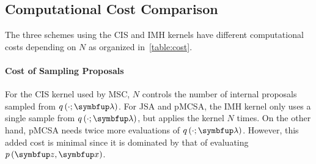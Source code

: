 
\begin{table*}[t]
  \vspace{-2ex}
  \centering
  
  \vspace{-1ex}
\end{table*}
%
\vspace{-0.05in}
\subsection{Computational Cost Comparison}
\vspace{-0.05in}
The three schemes using the CIS and IMH kernels have different computational costs depending on \(N\) as organized in~\cref{table:cost}.

\vspace{-0.1in}
\paragraph{Cost of Sampling Proposals}
For the CIS kernel used by MSC, \(N\) controls the number of internal proposals sampled from \(q\,(\cdot; \vlambda)\).
For JSA and pMCSA, the IMH kernel only uses a single sample from \(q\,(\cdot; \vlambda)\), but applies the kernel \(N\) times.
On the other hand, pMCSA needs twice more evaluations of \(q\,(\cdot; \vlambda)\).
However, this added cost is minimal since it is dominated by that of evaluating \(p\,(\vz,\vx)\).

